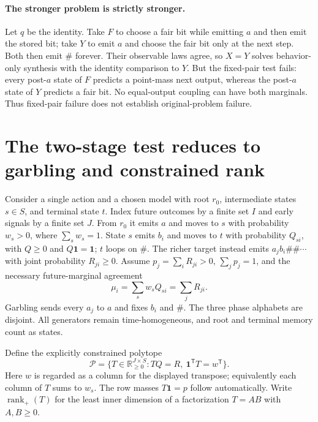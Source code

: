 \documentclass[11pt]{article}
\newcommand{\one}{\mathbf{1}}
\newcommand{\R}{\mathbb{R}}
\begin{document}
\paragraph{The stronger problem is strictly stronger.}
Let $q$ be the identity. Take $F$ to choose a fair bit while emitting $a$ and then emit the stored bit; take $Y$ to emit $a$ and choose the fair bit only at the next step. Both then emit $\#$ forever. Their observable laws agree, so $X=Y$ solves behavior-only synthesis with the identity comparison to $Y$. But the fixed-pair test fails: every post-$a$ state of $F$ predicts a point-mass next output, whereas the post-$a$ state of $Y$ predicts a fair bit. No equal-output coupling can have both marginals. Thus fixed-pair failure does not establish original-problem failure.

\section{The two-stage test reduces to garbling and constrained rank}
\label{sec:twostage}

Consider a single action and a chosen model with root $r_0$, intermediate states $s\in S$, and terminal state $t$. Index future outcomes by a finite set $I$ and early signals by a finite set $J$. From $r_0$ it emits $a$ and moves to $s$ with probability $w_s>0$, where $\sum_sw_s=1$. State $s$ emits $b_i$ and moves to $t$ with probability $Q_{si}$, with $Q\geq0$ and $Q\one=\one$; $t$ loops on $\#$. The richer target instead emits $a_jb_i\#\#\cdots$ with joint probability $R_{ji}\geq0$. Assume $p_j=\sum_iR_{ji}>0$, $\sum_jp_j=1$, and the necessary future-marginal agreement
\[
 \mu_i=\sum_sw_sQ_{si}=\sum_jR_{ji}.
\]
Garbling sends every $a_j$ to $a$ and fixes $b_i$ and $\#$. The three phase alphabets are disjoint. All generators remain time-homogeneous, and root and terminal memory count as states.

Define the explicitly constrained polytope
\begin{equation}
 \mathcal P=\{T\in\R_{\geq0}^{J\times S}:TQ=R,\ \one^{\mathsf T}T=w^{\mathsf T}\}.
 \label{eq:polytope}
\end{equation}
Here $w$ is regarded as a column for the displayed transpose; equivalently each column of $T$ sums to $w_s$. The row masses $T\one=p$ follow automatically. Write $\operatorname{rank}_+(T)$ for the least inner dimension of a factorization $T=AB$ with $A,B\geq0$.
\end{document}
